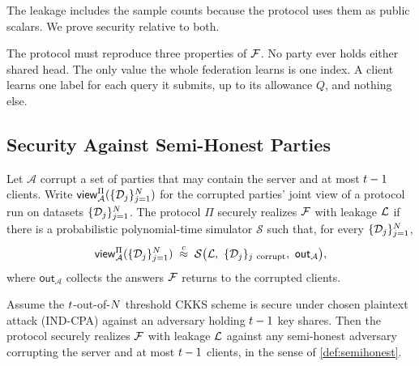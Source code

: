 The leakage includes the sample counts because the protocol uses them as public
scalars. We prove security relative to both.

The protocol must reproduce three properties of $\mathcal{F}$. No party ever holds
either shared head. The only value the whole federation learns is one index. A
client learns one label for each query it submits, up to its allowance $Q$, and
nothing else.

\subsection{Security Against Semi-Honest Parties}
\label{sec:semihonest}

\begin{definition}
\label{def:semihonest}
Let $\mathcal{A}$ corrupt a set of parties that may contain the server and at
most $t-1$ clients. Write
$\mathsf{view}_{\mathcal{A}}^{\Pi}(\{\mathcal{D}_j\}_{j=1}^{N})$ for the corrupted parties' joint view
of a protocol run on datasets $\{\mathcal{D}_j\}_{j=1}^{N}$. The protocol $\Pi$ securely realizes
$\mathcal{F}$ with leakage $\mathcal{L}$ if there is a probabilistic polynomial-time
simulator $\mathcal{S}$ such that, for every $\{\mathcal{D}_j\}_{j=1}^{N}$,
\[
  \mathsf{view}_{\mathcal{A}}^{\Pi}(\Dset)
  \;\stackrel{c}{\approx}\;
  \mathcal{S}\big(\Leak,\ \{\Dj\}_{j\ \mathrm{corrupt}},\ \mathsf{out}_{\mathcal{A}}\big),
\]
where $\mathsf{out}_{\mathcal{A}}$ collects the answers $\mathcal{F}$ returns to the
corrupted clients.
\end{definition}


\begin{theorem}
\label{thm:semihonest}
Assume the $t$-out-of-$N$ threshold CKKS scheme is secure under chosen
plaintext attack (IND-CPA) against an
adversary holding $t-1$ key shares. Then the protocol securely realizes $\mathcal{F}$
with leakage $\mathcal{L}$ against any semi-honest adversary corrupting the server
and at most $t-1$ clients, in the sense of
\cref{def:semihonest}.
\end{theorem}

